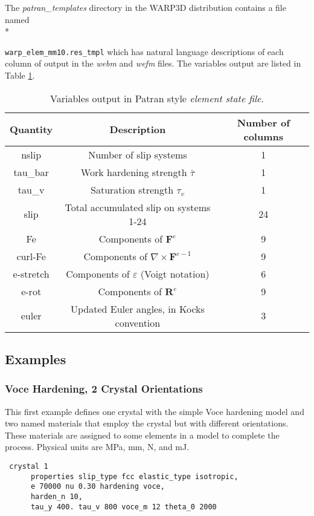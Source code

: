 \documentclass[11pt]{report}
\numberwithin{equation}{section}
\newcommand{\ttt} {\texttt}  %
\newcommand{\ti}{\emph}
\begin{document}
The \ti{patran\_templates}
directory in the WARP3D distribution contains a file named \\*
\small{\ttt{{warp\_elem\_mm10.res\_tmpl}} \normalsize which has 
natural language descriptions of each column of output in the \ti{webm} and \ti{wefm} files.  The 
variables output are listed in Table \ref{tab:ele-state}.  

\begin{table}[htb]
\small
\centering
\setlength{\extrarowheight}{3pt}
\begin{tabular}{|c|c|c|}
\hline 
Quantity & Description & Number of columns\tabularnewline
\hline 
\hline 
nslip & Number of slip systems & 1\tabularnewline
\hline 
tau\_bar & Work hardening strength $\bar{\tau}$ & 1\tabularnewline
\hline 
tau\_v & Saturation strength $\tau_{v}$ & 1\tabularnewline
\hline 
slip & Total accumulated slip on systems 1-24 & 24\tabularnewline
\hline 
Fe & Components of $\mathbf{F}^{e}$ & 9\tabularnewline
\hline 
curl-Fe & Components of $\nabla\times\mathbf{F}^{e-1}$ & 9\tabularnewline
\hline 
e-stretch & Components of $\varepsilon$ (Voigt notation) & 6\tabularnewline
\hline 
e-rot & Components of $\mathbf{R}^{e}$ & 9\tabularnewline
\hline 
euler & Updated Euler angles, in Kocks convention & 3\tabularnewline
\hline 
\end{tabular}
\caption{Variables output in Patran style \ti{element state file}. \label{tab:ele-state}}
\normalsize
\end{table}

\subsection{Examples}
\subsubsection{Voce Hardening, 2 Crystal Orientations}
This first example defines one crystal with the simple Voce hardening model
and two named materials that employ the crystal but with different
orientations. These materials are
assigned to some elements in a model to
complete the process. Physical units are MPa, mm, N, and mJ.

\small
\begin{verbatim}
 crystal 1
      properties slip_type fcc elastic_type isotropic,
      e 70000 nu 0.30 hardening voce,
      harden_n 10,
      tau_y 400. tau_v 800 voce_m 12 theta_0 2000


\end{verbatim}}
\end{document}
